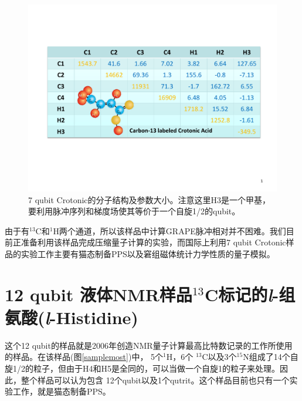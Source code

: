 \begin{figure}[htbp]
            \begin{center}
              \includegraphics[width= 0.8\columnwidth]{figures/samplehcrotonic.pdf}
              \caption{7 qubit Crotonic的分子结构及参数大小。注意这里H3是一个甲基，要利用脉冲序列和梯度场使其等价于一个自旋1/2的qubit。}
              \label{samplehcrotonic}
            \end{center}
\end{figure}

由于有$^{13}$C和$^{1}$H两个通道，所以该样品中计算GRAPE脉冲相对并不困难。我们目前正准备利用该样品完成压缩量子计算\cite{app28}的实验，而国际上利用7
 qubit Crotonic样品的实验工作主要有猫态制备PPS\cite{pps3}以及窘组磁体统计力学性质的量子模拟\cite{app29}。

 \section{12 qubit 液体NMR样品$^{13}$C标记的\emph{l}-组氨酸(\emph{l}-Histidine)}

 这个12 qubit的样品就是2006年创造NMR量子计算最高比特数记录的工作所使用的样品。在该样品(图\ref{samplemost})中，
 5个$^{1}$H，6个 $^{13}$C以及3个$^{15}$N组成了14个自旋1/2的粒子，但由于H4和H5是全同的，可以当做一个自旋1的粒子来处理。因此，整个样品可以认为包含
 12个qubit以及1个qutrit。这个样品目前也只有一个实验工作，就是猫态制备PPS\cite{12qubit}。 
 
